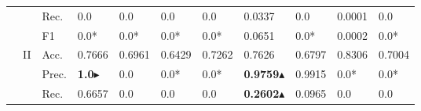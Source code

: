 \begin{tabular}{cclllllllll}
                                                                                           &                                   & Rec.                                                 & 0.0                     & 0.0                     & 0.0                          & 0.0                     & 0.0337                                                                       & 0.0                                                                         & 0.0001                                    & 0.0                                       \\
                                                                                           &                                   & F1                                                   & 0.0*                    & 0.0*                    & 0.0*                         & 0.0*                    & 0.0651                                                                       & 0.0*                                                                        & 0.0002                                    & 0.0*                                      \\ 
    \cmidrule{2-11}
                                                                                           & \multirow{4}{*}{II}               & Acc.                                                 & 0.7666                  & 0.6961                  & 0.6429                       & 0.7262                  & 0.7626                                                                       & 0.6797                                                                      & 0.8306                                    & 0.7004                                    \\
                                                                                           &                                   & Prec.                                                & \textbf{1.0}$\blacktriangleright$            & 0.0                     & 0.0*                         & 0.0*                    & \textbf{0.9759}$\blacktriangle$                                                                        & 0.9915                                                                      & 0.0*                                      & 0.0*                                      \\
                                                                                           &                                   & Rec.                                                 & 0.6657                  & 0.0                     & 0.0                          & 0.0                     & \textbf{0.2602}$\blacktriangle$                                                                        & 0.0965                                                                      & 0.0                                       & 0.0                                       \\

\end{tabular}
